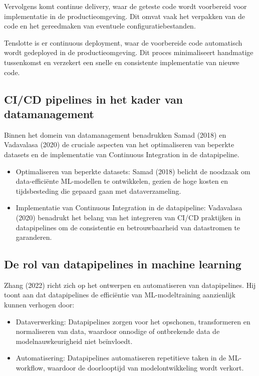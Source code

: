 Vervolgens komt continue delivery, waar de geteste code wordt voorbereid voor implementatie in de productieomgeving. Dit omvat vaak het verpakken van de code en het gereedmaken van eventuele configuratiebestanden.

Tenslotte is er continuous deployment, waar de voorbereide code automatisch wordt gedeployed in de productieomgeving. Dit proces minimaliseert handmatige tussenkomst en verzekert een snelle en consistente implementatie van nieuwe code.

\subsection{CI/CD pipelines in het kader van datamanagement}

Binnen het domein van datamanagement benadrukken Samad (2018) en Vadavalasa (2020) de cruciale aspecten van het optimaliseren van beperkte datasets en de implementatie van Continuous Integration in de datapipeline.

\begin{itemize}
    \item Optimaliseren van beperkte datasets: Samad (2018) belicht de noodzaak om data-efficiënte ML-modellen te ontwikkelen, gezien de hoge kosten en tijdsbesteding die gepaard gaan met dataverzameling.
    \item Implementatie van Continuous Integration in de datapipeline: Vadavalasa (2020) benadrukt het belang van het integreren van CI/CD praktijken in datapipelines om de consistentie en betrouwbaarheid van datastromen te garanderen.
\end{itemize}

\subsection{De rol van datapipelines in machine learning}

Zhang (2022) richt zich op het ontwerpen en automatiseren van datapipelines. Hij toont aan dat datapipelines de efficiëntie van ML-modeltraining aanzienlijk kunnen verhogen door:

\begin{itemize}
    \item Dataverwerking: Datapipelines zorgen voor het opschonen, transformeren en normaliseren van data, waardoor onnodige of ontbrekende data de modelnauwkeurigheid niet beïnvloedt.
    \item Automatisering: Datapipelines automatiseren repetitieve taken in de ML-workflow, waardoor de doorlooptijd van modelontwikkeling wordt verkort.
\end{itemize}\\


